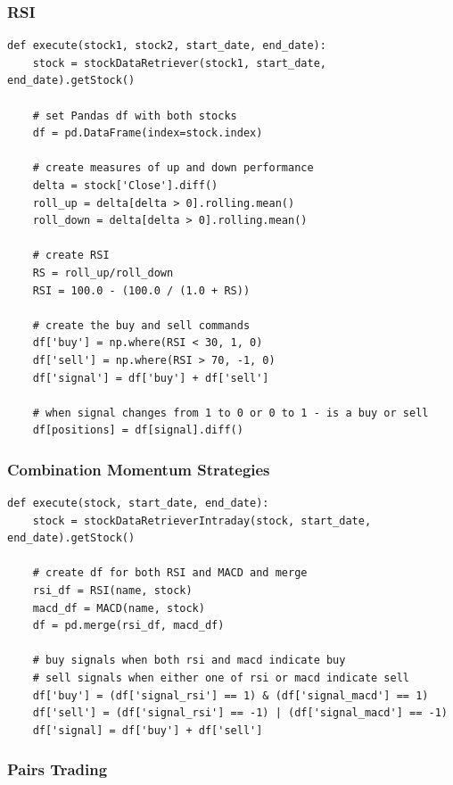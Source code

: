 \documentclass[letterpaper,11pt]{article}
\begin{document}
\subsubsection{RSI }

\begin{verbatim}
def execute(stock1, stock2, start_date, end_date):
    stock = stockDataRetriever(stock1, start_date, end_date).getStock()

    # set Pandas df with both stocks
    df = pd.DataFrame(index=stock.index)

    # create measures of up and down performance
    delta = stock['Close'].diff()
    roll_up = delta[delta > 0].rolling.mean()
    roll_down = delta[delta > 0].rolling.mean()
    
    # create RSI
    RS = roll_up/roll_down
    RSI = 100.0 - (100.0 / (1.0 + RS))

    # create the buy and sell commands
    df['buy'] = np.where(RSI < 30, 1, 0)
    df['sell'] = np.where(RSI > 70, -1, 0)
    df['signal'] = df['buy'] + df['sell']

    # when signal changes from 1 to 0 or 0 to 1 - is a buy or sell
    df[positions] = df[signal].diff()

\end{verbatim}

\subsubsection{Combination Momentum Strategies }

\begin{verbatim}
def execute(stock, start_date, end_date):
    stock = stockDataRetrieverIntraday(stock, start_date, end_date).getStock()
	
    # create df for both RSI and MACD and merge
    rsi_df = RSI(name, stock)
    macd_df = MACD(name, stock)
    df = pd.merge(rsi_df, macd_df)
    
    # buy signals when both rsi and macd indicate buy
    # sell signals when either one of rsi or macd indicate sell
    df['buy'] = (df['signal_rsi'] == 1) & (df['signal_macd'] == 1)
    df['sell'] = (df['signal_rsi'] == -1) | (df['signal_macd'] == -1)
    df['signal] = df['buy'] + df['sell']

\end{verbatim}

\subsubsection{Pairs Trading}
\end{document}
